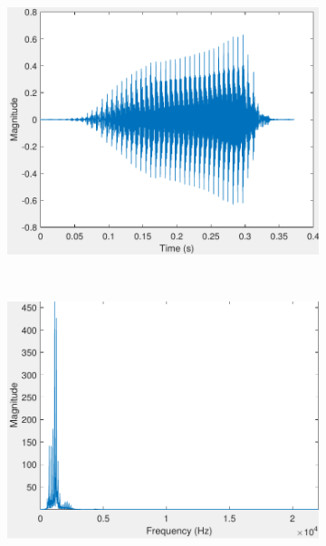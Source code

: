 \begin{figure}[htb!]
\centering
      \begin{subfigure}[b]{0.32\textwidth}
           \includegraphics[width=1\textwidth,height=0.75\textwidth]{image/LR/waveform.pdf}
    \end{subfigure}%
	~
	      \begin{subfigure}[b]{0.32\textwidth}
           \includegraphics[width=1\textwidth,height=0.75\textwidth]{image/LR/spectrum.pdf}
    \end{subfigure}%
	~
    \begin{subfigure}[b]{0.32\textwidth}

\end{subfigure}
\end{figure}
